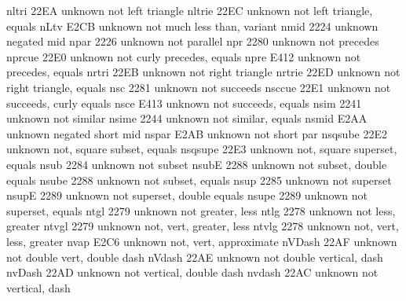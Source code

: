  nltri                   22EA {unknown} not left triangle
 nltrie                  22EC {unknown} not left triangle, equals
 nLtv                    E2CB {unknown} not much less than, variant
 nmid                    2224 {unknown} negated mid
 npar                    2226 {unknown} not parallel
 npr                     2280 {unknown} not precedes
 nprcue                  22E0 {unknown} not curly precedes, equals
 npre                    E412 {unknown} not precedes, equals
 nrtri                   22EB {unknown} not right triangle
 nrtrie                  22ED {unknown} not right triangle, equals
 nsc                     2281 {unknown} not succeeds
 nsccue                  22E1 {unknown} not succeeds, curly equals
 nsce                    E413 {unknown} not succeeds, equals
 nsim                    2241 {unknown} not similar
 nsime                   2244 {unknown} not similar, equals
 nsmid                   E2AA {unknown} negated short mid
 nspar                   E2AB {unknown} not short par
 nsqsube                 22E2 {unknown} not, square subset, equals
 nsqsupe                 22E3 {unknown} not, square superset, equals
 nsub                    2284 {unknown} not subset
 nsubE                   2288 {unknown} not subset, double equals
 nsube                   2288 {unknown} not subset, equals
 nsup                    2285 {unknown} not superset
 nsupE                   2289 {unknown} not superset, double equals
 nsupe                   2289 {unknown} not superset, equals
 ntgl                    2279 {unknown} not greater, less
 ntlg                    2278 {unknown} not less, greater
 ntvgl                   2279 {unknown} not, vert, greater, less
 ntvlg                   2278 {unknown} not, vert, less, greater
 nvap                    E2C6 {unknown} not, vert, approximate
 nVDash                  22AF {unknown} not double vert, double dash
 nVdash                  22AE {unknown} not double vertical, dash
 nvDash                  22AD {unknown} not vertical, double dash
 nvdash                  22AC {unknown} not vertical, dash
